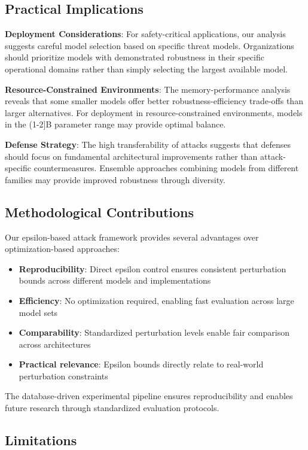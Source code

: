 \subsection{Practical Implications}

\textbf{Deployment Considerations}: For safety-critical applications, our analysis suggests careful model selection based on specific threat models. Organizations should prioritize models with demonstrated robustness in their specific operational domains rather than simply selecting the largest available model.

\textbf{Resource-Constrained Environments}: The memory-performance analysis reveals that some smaller models offer better robustness-efficiency trade-offs than larger alternatives. For deployment in resource-constrained environments, models in the (1-2]B parameter range may provide optimal balance.

\textbf{Defense Strategy}: The high transferability of attacks suggests that defenses should focus on fundamental architectural improvements rather than attack-specific countermeasures. Ensemble approaches combining models from different families may provide improved robustness through diversity.

\subsection{Methodological Contributions}

Our epsilon-based attack framework provides several advantages over optimization-based approaches:
\begin{itemize}
    \item \textbf{Reproducibility}: Direct epsilon control ensures consistent perturbation bounds across different models and implementations
    \item \textbf{Efficiency}: No optimization required, enabling fast evaluation across large model sets
    \item \textbf{Comparability}: Standardized perturbation levels enable fair comparison across architectures
    \item \textbf{Practical relevance}: Epsilon bounds directly relate to real-world perturbation constraints
\end{itemize}

The database-driven experimental pipeline ensures reproducibility and enables future research through standardized evaluation protocols.

\subsection{Limitations}

